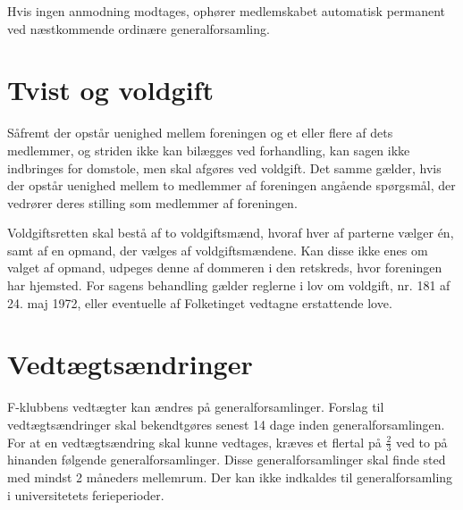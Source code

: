 \documentclass[a4paper,12pt,danish]{article}
\begin{document}
\begin{list}
Hvis ingen anmodning modtages, ophører medlemskabet automatisk permanent
ved næstkommende ordinære generalforsamling.

\section{Tvist og voldgift}

\item Såfremt der opstår uenighed mellem foreningen og et
  eller flere af dets medlemmer, og striden ikke kan bilægges ved
  forhandling, kan sagen ikke indbringes for domstole, men skal
  afgøres ved voldgift. Det samme gælder, hvis der opstår
  uenighed mellem to medlemmer af foreningen angående
  spørgsmål, der vedrører deres stilling som medlemmer af
  foreningen. 
  
  Voldgiftsretten skal bestå af to voldgiftsmænd, hvoraf hver
  af parterne vælger \'{e}n, samt af en opmand, der vælges af
  voldgiftsmændene. Kan disse ikke enes om valget af opmand,
  udpeges denne af dommeren i den retskreds, hvor foreningen har
  hjemsted. For sagens behandling gælder reglerne i lov om
  voldgift, nr. 181 af 24. maj 1972, eller eventuelle af Folketinget
  vedtagne erstattende love.

\section{Vedtægtsændringer}
  
\item F-klubbens vedtægter kan ændres på
  generalforsamlinger. Forslag til vedtægtsændringer skal
  bekendtgøres senest 14 dage inden generalforsamlingen. For at en
  vedtægtsændring skal kunne vedtages, kræves et flertal
  på $\frac{2}{3}$ ved to på hinanden følgende
  generalforsamlinger. Disse generalforsamlinger skal finde sted med
  mindst 2 måneders mellemrum.
  Der kan ikke indkaldes til generalforsamling i universitetets ferieperioder.

\end{list}
\end{document}
